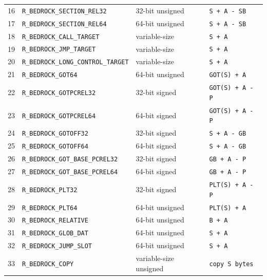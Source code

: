 \documentclass[10pt,twoside]{article}
\begin{document}
\begin{longtable}{@{}p{0.45in}p{2.15in}p{0.85in}p{2.05in}@{}}
16 & \texttt{R\_\allowbreak{}BEDROCK\_\allowbreak{}SECTION\_\allowbreak{}REL32} & 32-bit unsigned & \texttt{S + A - SB}\\
17 & \texttt{R\_\allowbreak{}BEDROCK\_\allowbreak{}SECTION\_\allowbreak{}REL64} & 64-bit unsigned & \texttt{S + A - SB}\\
18 & \texttt{R\_\allowbreak{}BEDROCK\_\allowbreak{}CALL\_\allowbreak{}TARGET} & variable-size & \texttt{S + A}\\
19 & \texttt{R\_\allowbreak{}BEDROCK\_\allowbreak{}JMP\_\allowbreak{}TARGET} & variable-size & \texttt{S + A}\\
20 & \texttt{R\_\allowbreak{}BEDROCK\_\allowbreak{}LONG\_\allowbreak{}CONTROL\_\allowbreak{}TARGET} & variable-size & \texttt{S + A}\\
21 & \texttt{R\_\allowbreak{}BEDROCK\_\allowbreak{}GOT64} & 64-bit unsigned & \texttt{GOT(S) + A}\\
22 & \texttt{R\_\allowbreak{}BEDROCK\_\allowbreak{}GOTPCREL32} & 32-bit signed & \texttt{GOT(S) + A - P}\\
23 & \texttt{R\_\allowbreak{}BEDROCK\_\allowbreak{}GOTPCREL64} & 64-bit signed & \texttt{GOT(S) + A - P}\\
24 & \texttt{R\_\allowbreak{}BEDROCK\_\allowbreak{}GOTOFF32} & 32-bit signed & \texttt{S + A - GB}\\
25 & \texttt{R\_\allowbreak{}BEDROCK\_\allowbreak{}GOTOFF64} & 64-bit signed & \texttt{S + A - GB}\\
26 & \texttt{R\_\allowbreak{}BEDROCK\_\allowbreak{}GOT\_\allowbreak{}BASE\_\allowbreak{}PCREL32} & 32-bit signed & \texttt{GB + A - P}\\
27 & \texttt{R\_\allowbreak{}BEDROCK\_\allowbreak{}GOT\_\allowbreak{}BASE\_\allowbreak{}PCREL64} & 64-bit signed & \texttt{GB + A - P}\\
28 & \texttt{R\_\allowbreak{}BEDROCK\_\allowbreak{}PLT32} & 32-bit signed & \texttt{PLT(S) + A - P}\\
29 & \texttt{R\_\allowbreak{}BEDROCK\_\allowbreak{}PLT64} & 64-bit unsigned & \texttt{PLT(S) + A}\\
30 & \texttt{R\_\allowbreak{}BEDROCK\_\allowbreak{}RELATIVE} & 64-bit unsigned & \texttt{B + A}\\
31 & \texttt{R\_\allowbreak{}BEDROCK\_\allowbreak{}GLOB\_\allowbreak{}DAT} & 64-bit unsigned & \texttt{S + A}\\
32 & \texttt{R\_\allowbreak{}BEDROCK\_\allowbreak{}JUMP\_\allowbreak{}SLOT} & 64-bit unsigned & \texttt{S + A}\\
33 & \texttt{R\_\allowbreak{}BEDROCK\_\allowbreak{}COPY} & variable-size unsigned & \texttt{copy S bytes}\\

\end{longtable}
\end{document}
